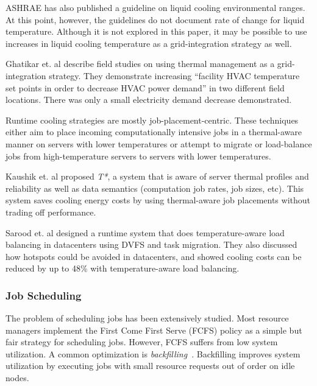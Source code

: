 ASHRAE has also published a guideline on liquid cooling environmental ranges. At this point, however, the guidelines do not document rate of
change for liquid temperature. Although it is not explored in this paper, it
may be possible to use increases in liquid cooling temperature as a
grid-integration strategy as well. 

Ghatikar et. al \cite{Ghatikar2012a} describe field studies on using thermal
management as a grid-integration strategy. They demonstrate increasing ``facility HVAC temperature set points in order to decrease HVAC power
demand” in two different field locations. There was only a small
electricity demand decrease demonstrated.

Runtime cooling strategies are mostly job-placement-centric. These techniques
either aim to place incoming computationally intensive jobs in a thermal-aware
manner on servers with lower temperatures or attempt to migrate or load-balance
jobs from high-temperature servers to servers with lower temperatures.

Kaushik et. al \cite{kaushik_t*:_2012} proposed \emph{T*}, a system that is
aware of server thermal profiles and reliability as well as data semantics
(computation job rates, job sizes, etc). This system saves cooling energy costs
by using thermal-aware job placements without trading off performance.

Sarood et. al \cite{SaroodSC11} designed a runtime system that does
temperature-aware load balancing in datacenters using DVFS and task migration.
They also discussed how hotspots could be avoided in datacenters, and showed
cooling costs can be reduced by up to 48\% with temperature-aware load
balancing.

\subsubsection{Job Scheduling}
The problem of scheduling jobs has been extensively studied. Most resource
managers implement the First Come First Serve (FCFS) policy as a simple but fair
strategy for scheduling jobs. However, FCFS suffers from low system utilization.
A common optimization is \emph{backfilling}~\cite{lifka_anl/ibm_1995,mualem_utilization_2001,feitelson_parallel_2004}.
Backfilling improves system utilization by executing jobs with small resource
requests out of order on idle nodes.

